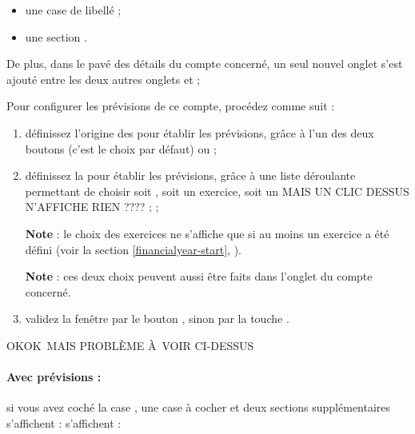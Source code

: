 \begin{itemize}
	\item une case de libellé  ; 
	\item une section .
\end{itemize}

De plus, dans le pavé des détails du compte concerné, un seul nouvel onglet  s'est ajouté entre les deux autres onglets  et  ; 

Pour configurer les prévisions de ce compte, procédez comme suit :
\begin{enumerate}	
	\item définissez l'origine des  pour établir les prévisions, grâce à l'un des deux boutons  (c'est le choix par défaut) ou  ;
	\item définissez la  pour établir les prévisions, grâce à une liste déroulante permettant de choisir soit , soit un exercice, soit un  MAIS UN CLIC DESSUS N'AFFICHE RIEN ???? ; ; %
	
	\textbf{Note} : le choix des exercices ne s'affiche que si au moins un exercice a été défini (voir la section \vref{financialyear-start}, ).
	
	\textbf{Note} : ces deux choix peuvent aussi être faits dans l'onglet  du compte concerné.
	\item validez la fenêtre par le bouton , sinon par la touche .	
\end{enumerate}

OKOK MAIS PROBLÈME À VOIR CI-DESSUS

\paragraph{Avec prévisions :}si vous avez coché la case , une case à cocher et deux sections supplémentaires \ifIllustration s'affichent :
\else s'affichent : 
\fi

